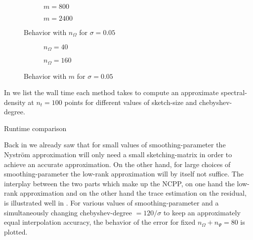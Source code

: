 \begin{figure}[ht]
    \begin{subfigure}[b]{0.49\columnwidth}
        
        \caption{$m=800$}
        \label{fig:5-experiments-electronic-structure-convergence-nv-m800}
    \end{subfigure}
    \begin{subfigure}[b]{0.49\columnwidth}
        
        \caption{$m=2400$}
        \label{fig:5-experiments-electronic-structure-convergence-nv-m2400}
    \end{subfigure}
    \caption{Behavior with $n_{\Omega}$ for $\sigma=0.05$}
    \label{fig:5-experiments-electronic-structure-convergence-nv}
\end{figure}

\begin{figure}[ht]
    \centering
    \begin{subfigure}[b]{0.49\columnwidth}
        
        \caption{$n_{\Omega}=40$}
        \label{fig:5-experiments-electronic-structure-convergence-m-nv40}
    \end{subfigure}
    \begin{subfigure}[b]{0.49\columnwidth}
        
        \caption{$n_{\Omega}=160$}
        \label{fig:5-experiments-electronic-structure-convergence-m-nv160}
    \end{subfigure}
    \caption{Behavior with $m$ for $\sigma=0.05$}
    \label{fig:5-experiments-electronic-structure-convergence-m}
\end{figure}

In  we list the wall time each method
takes to compute an approximate \gls{spectral-density} at $n_t=100$ points
for different values of \gls{sketch-size} and \gls{chebyshev-degree}.

\begin{table}[ht]
    \caption{Runtime comparison}
    \label{tab:5-experiments-timing-DGC}
    
\end{table}

Back in  we already saw that for small values of \gls{smoothing-parameter}
the Nystr\"om approximation will only need a small \gls{sketching-matrix} in order
to achieve an accurate approximation. On the other hand, for large choices of
\gls{smoothing-parameter} the low-rank approximation will by itself not suffice.
The interplay between the two parts which make up the \gls{NCPP},
on one hand the low-rank approximation and on the other hand the
trace estimation on the residual, is illustrated well in
.
For various values of \gls{smoothing-parameter} and a simultaneously changing
\gls{chebyshev-degree} $=120 / \sigma$ to keep an approximately equal interpolation
accuracy, the behavior of the error for fixed $n_{\Omega} + n_{\Psi} = 80$ is plotted.

